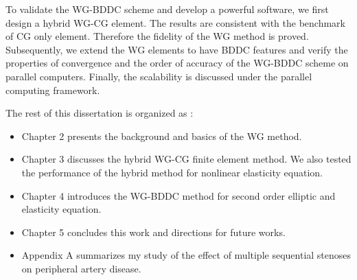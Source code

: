 To validate the WG-BDDC scheme and develop a powerful software, we first design a hybrid WG-CG element. The results are consistent with the benchmark of CG only element. Therefore the fidelity of the WG method is proved. Subsequently, we extend the WG elements to have BDDC features  and verify the properties of convergence and the order of accuracy of the WG-BDDC scheme on parallel computers. Finally, the scalability is discussed under the parallel computing framework.

The rest of this dissertation is organized as :

\begin{itemize}
	\item Chapter 2 presents the background and basics of the WG method.
	\item Chapter 3 discusses the hybrid WG-CG finite element method. We also tested the performance of the hybrid method for nonlinear elasticity equation.
	\item Chapter 4 introduces the WG-BDDC method for second order elliptic and elasticity equation.
	\item Chapter 5 concludes this work and directions for future works.
	\item Appendix A summarizes my study of the effect of multiple sequential stenoses on peripheral artery disease.
\end{itemize}
